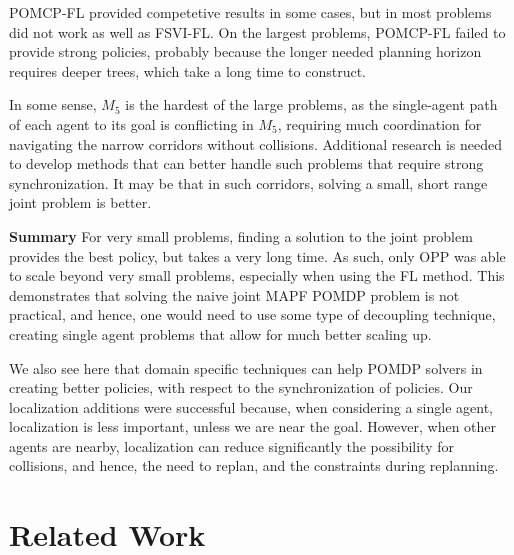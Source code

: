 \documentclass[letterpaper]{article} %
\begin{document}
POMCP-FL provided competetive results in some cases, but in most problems did not work as well as FSVI-FL. On the largest problems, POMCP-FL failed to provide strong policies, probably because the longer needed planning horizon requires deeper trees, which take a long time to construct.

In some sense, $M_5$ is the hardest of the large problems, as the single-agent path of each agent to its goal is conflicting in $M_5$, requiring much coordination for navigating the narrow corridors without collisions. 
Additional research is needed to develop methods that can better handle such problems that require strong synchronization. It may be that in such corridors, solving a small, short range joint problem is better.

\noindent\textbf{Summary} For very small problems, finding a solution to the joint problem provides the best policy, but takes a very long time. As such, only OPP was able to scale beyond very small problems, especially when using the FL method. This demonstrates that solving the naive joint MAPF POMDP problem is not practical, and hence, one would need to use some type of decoupling technique, creating single agent problems that allow for much better scaling up.

We also see here that domain specific techniques can help POMDP solvers in creating better policies, with respect to the synchronization of policies. Our localization additions were successful because, when considering a single agent, localization is less important, unless we are near the goal. However, when other agents are nearby, localization can reduce significantly the possibility for collisions, and hence, the need to replan, and the constraints during replanning.




\section{Related Work}
\end{document}
